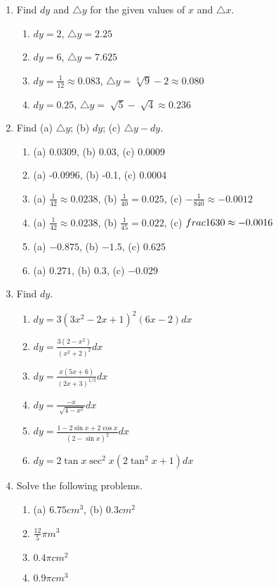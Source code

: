 \documentclass[12pt]{article}
\begin{document}
    \begin{enumerate}
        
        \item Find \(dy\) and \(\triangle{y}\) for the given values of \(x\) and \(\triangle{x}\).
        \begin{enumerate}[label*=\arabic*.]
            \item \(dy = 2\), \(\triangle{y} = 2.25\)
            \item \(dy = 6\), \(\triangle{y} = 7.625\)
            \item \(dy = \frac{1}{12} \approx 0.083\), \(\triangle{y} = \sqrt[3]{9} - 2 \approx 0.080\)
            \item \(dy = 0.25\), \(\triangle{y} = \sqrt[]{5} - \sqrt[]{4} \approx 0.236\)
        \end{enumerate}

        \item Find (a) \(\triangle{y}\); (b) \(dy\); (c) \(\triangle{y} - dy\).
        \begin{enumerate}[label*=\arabic*.]
            \item (a) 0.0309, (b) 0.03, (c) 0.0009
            \item (a) -0.0996, (b) -0.1, (c) 0.0004
            \item (a) \(\frac{1}{42} \approx 0.0238\), (b) \(\frac{1}{40} = 0.025\), (c) \(-\frac{1}{840} \approx -0.0012\)
            \item (a) \(\frac{1}{42} \approx 0.0238\), (b) \(\frac{1}{45} = 0.022\), (c) \(\-frac{1}{630} \approx -0.0016\)
            \item (a) \(-0.875\), (b) \(-1.5\), (c) \(0.625\)
            \item (a) \(0.271\), (b) \(0.3\), (c) \(-0.029\)
        \end{enumerate}

        \item Find \(dy\).
        \begin{enumerate}[label*=\arabic*.]
            \item \(dy = 3{(3x^2 - 2x + 1)}^2(6x - 2)dx\)
            \item \(dy = \frac{3(2 - x^2)}{{(x^2 + 2)}^2}dx\)
            \item \(dy = \frac{x(5x + 6)}{{(2x + 3)}^{1/2}}dx\)
            \item \(dy = \frac{-x}{\sqrt[]{4 - x^2}}dx\)
            \item \(dy = \frac{1 - 2\sin{x} + 2\cos{x}}{{(2 - \sin{x})}^2}dx\)
            \item \(dy = 2 \tan{x} \sec^2{x}(2\tan^2{x} + 1)dx\)
        \end{enumerate}

        \item Solve the following problems.
        \begin{enumerate}[label*=\arabic*.]
            \item (a) \(6.75 cm^3\), (b) \(0.3 cm^2\)
            \item \(\frac{12}{5} \pi m^3\)
            \item \(0.4 \pi cm^2\)
            \item \(0.9 \pi cm^3\)
        \end{enumerate}

    \end{enumerate}
\end{document}
